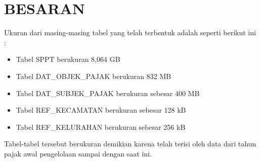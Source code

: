 \chapter{BESARAN}

Ukuran dari masing-masing tabel yang telah terbentuk adalah seperti berikut ini :

\begin{itemize}
	\item Tabel SPPT berukuran 8,064 GB
	\item Tabel DAT\_OBJEK\_PAJAK berukuran 832 MB
	\item Tabel DAT\_SUBJEK\_PAJAK berukuran sebesar 400 MB
	\item Tabel REF\_KECAMATAN berukuran sebesar 128 kB
	\item Tabel REF\_KELURAHAN berukuran sebesar 256 kB
\end{itemize}

Tabel-tabel tersebut berukuran demikian karena telah terisi oleh data dari tahun pajak awal pengelolaan sampai dengan saat ini.